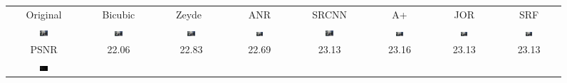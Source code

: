 \documentclass[10pt,twocolumn,letterpaper]{article}
\begin{document}
\begin{figure} [tb]
\setlength{\tabcolsep}{1pt}
\begin{tabular*}{\textwidth}{cccccccc}
    Original & Bicubic & Zeyde~\cite{Zeyde-CS-2012} & ANR\cite{Timofte-ICCV-2013} & SRCNN\cite{Dong-ECCV-2014} & A+\cite{Timofte-ACCV-2014} & JOR\cite{JOR:EG15} & SRF\cite{SR_forest} \\
 \includegraphics[width=0.12\textwidth]{fig/ed/119082[1-Original].jpg} &
 \includegraphics[width=0.12\textwidth]{fig/ed/119082[2-Bicubic].jpg} &
 \includegraphics[width=0.12\textwidth]{fig/ed/119082[3-Zeyde].jpg} &
    \includegraphics[width=0.12\textwidth]{fig/ed/119082[4-ANR].jpg} &
 \includegraphics[width=0.12\textwidth]{fig/ed/119082[5-SRCNN].jpg} &
    \includegraphics[width=0.12\textwidth]{fig/ed/119082[6-A+].jpg} &
    \includegraphics[width=0.12\textwidth]{fig/ed/119082[7-JOR].jpg} &
    \includegraphics[width=0.12\textwidth]{fig/ed/119082[8-SRF].jpg} \\
    PSNR & 22.06 & 22.83 & 22.69 & 23.13 & 23.16 & 23.13 & 23.13 \\
 \includegraphics[width=0.12\textwidth]{fig/ed/119082[1-Original]_cbd.jpg} &

\end{tabular*}
\end{figure}
\end{document}
